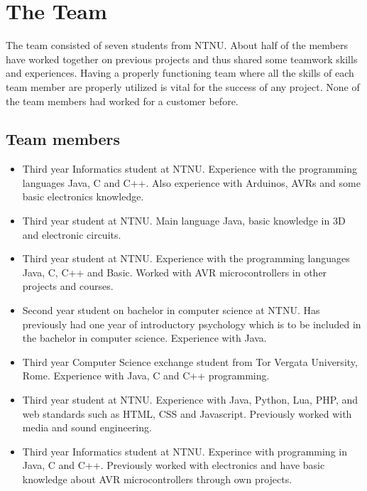 \section{The Team}
The team consisted of seven students from NTNU. About half of the members have worked
together on previous projects and thus shared some teamwork skills and experiences.
Having a properly functioning team where all the skills of each team member are properly
utilized is vital for the success of any project. None of the team members had 
worked for a customer before.

\subsection{Team members}

\begin{itemize}
\item{\anders}\newline
Third year Informatics student at NTNU. Experience with the programming languages Java,
C and C++. Also experience with Arduinos, AVRs and some basic electronics knowledge.

\item{\henrik}\newline
Third year student at NTNU. Main language Java, basic knowledge in 3D and electronic circuits.

\item{\johan}\newline
Third year student at NTNU. Experience with the programming languages Java, C, C++  and
Basic. Worked with AVR microcontrollers in other projects and courses.

\item{\asbjorn}\newline
Second year student on bachelor in computer science at NTNU. Has previously had one year of
introductory psychology which is to be included in the bachelor in computer science.
Experience with Java.

\item{\emanuele}\newline
Third year Computer Science exchange student from Tor Vergata University, Rome.
Experience with Java, C and C++ programming.

\item{\jonas}\newline
Third year student at NTNU. Experience with Java, Python, Lua, PHP, and web standards such as HTML,
CSS and Javascript. Previously worked with media and sound engineering.

\item{\bjornar}\newline
Third year Informatics student at NTNU. Experince with programming in Java, C and C++.
Previously worked with electronics and have basic knowledge about AVR microcontrollers through
own projects.
\end{itemize}

